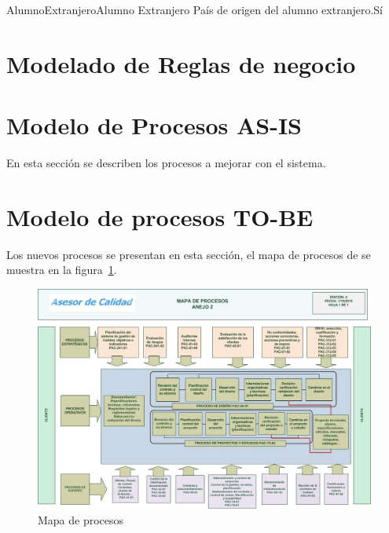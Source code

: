 \begin{cdtEntidad}{AlumnoExtranjero}{Alumno Extranjero}%
	{País de origen del alumno extranjero.}{Sí}
	\cdtEntityRelSection
\end{cdtEntidad}

\section{Modelado de Reglas de negocio}



\section{Modelo de Procesos AS-IS}

En esta sección se describen los procesos a mejorar con el sistema.



%
%

\section{Modelo de procesos TO-BE}

Los nuevos procesos se presentan en esta sección, el mapa de procesos de se muestra en la figura~\ref{fig:mapaProc}.

\begin{figure}[htbp]
	\begin{center}
		\includegraphics[width=.8\textwidth]{images/mapaProc}
		\caption{Mapa de procesos}
		\label{fig:mapaProc}
	\end{center}
\end{figure}



%
%
%

